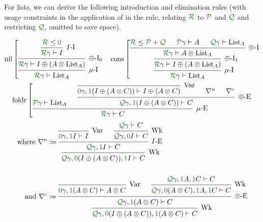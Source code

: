 \begin{example}\label{thm:list-rules}
  For lists, we can derive the following introduction and elimination rules
  (with usage constraints in the application of  in the
   rule, relating $\grR$ to $\grP$ and $\grQ$ and restricting
  $\grQ$, omitted to save space).

  \begin{align*}
    \text{nil}\left[
    \begin{prooftree}
      \hypo{\grR \leq \gr0}
      \infer1[$I$-I]{\grR\gamma \vdash I}
      \infer1[$\oplus$-I$_0$]%
      {\grR\gamma \vdash I \oplus \plr{A \otimes \mathrm{List}_A}}
      \infer1[$\mu$-I]{\grR\gamma \vdash \mathrm{List}_A}
    \end{prooftree}
    \right.
    &&
    \text{cons}\left[
    \begin{prooftree}
      \hypo{\grR \leq \grP + \grQ}
      \hypo{\grP\gamma \vdash A}
      \hypo{\grQ\gamma \vdash \mathrm{List}_A}
      \infer3[$\otimes$-I]{\grR\gamma \vdash A \otimes \mathrm{List}_A}
      \infer1[$\oplus$-I$_1$]%
      {\grR\gamma \vdash I \oplus \plr{A \otimes \mathrm{List}_A}}
      \infer1[$\mu$-I]{\grR\gamma \vdash \mathrm{List}_A}
    \end{prooftree}
    \right.
  \end{align*}
  \begin{displaymath}
    \text{foldr}\left[
    \begin{prooftree}
      \hypo{\grP\gamma \vdash \mathrm{List}_A}
      \infer0[Var]{\gr0\gamma, \gr1\plr{I \oplus \plr{A \otimes C}}
        \vdash I \oplus \plr{A \otimes C}}
      \hypo{\nabla^n}
      \hypo{\nabla^c}
      \infer3[$\oplus$-E]{\grQ\gamma, \gr1\plr{I \oplus \plr{A \otimes C}}
        \vdash C}
      \infer2[$\mu$-E]{\grR\gamma \vdash C}
    \end{prooftree}
    \right.
  \end{displaymath}
  \begin{align*}
    \textrm{where }\nabla^n &\coloneqq
    \begin{prooftree}
      \infer0[Var]{\gr0\gamma, \gr1I \vdash I}
      \hypo{\grQ\gamma \vdash C}
      \infer1[Wk]{\grQ\gamma, \gr0I \vdash C}
      \infer2[$I$-E]{\grQ\gamma, \gr1I \vdash C}
      \infer1[Wk]{\grQ\gamma, \gr0\plr{I \oplus \plr{A \otimes C}}, \gr1I
        \vdash C}
    \end{prooftree}
    \\\\
    \textrm{and }\nabla^c &\coloneqq
    \begin{prooftree}
      \infer0[Var]{\gr0\gamma, \gr1\plr{A \otimes C} \vdash A \otimes C}
      \hypo{\grQ\gamma, \gr1A, \gr1C \vdash C}
      \infer1[Wk]{\grQ\gamma, \gr0\plr{A \otimes C}, \gr1A, \gr1C \vdash C}
      \infer2[$\otimes$-E]{\grQ\gamma, \gr1\plr{A \otimes C} \vdash C}
      \infer1[Wk]%
      {\grQ\gamma, \gr0\plr{I \oplus \plr{A \otimes C}}, \gr1\plr{A \otimes C}
        \vdash C}
    \end{prooftree}
  \end{align*}
\end{example}

